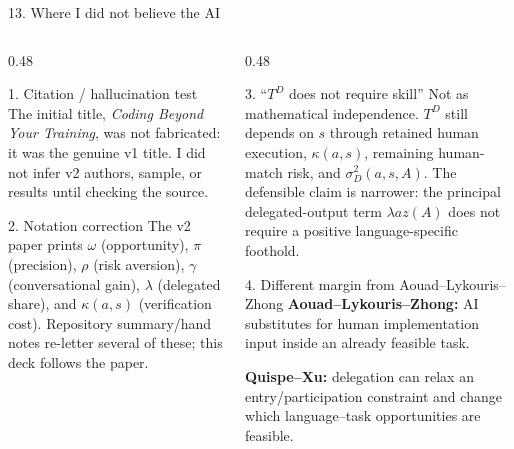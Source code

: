 \documentclass[aspectratio=169,10pt]{beamer}
\begin{document}
\begin{frame}{13. Where I did not believe the AI}
  \vspace{-0.03cm}
  \begin{columns}[T,onlytextwidth]
    \begin{column}{0.48\textwidth}
      \begin{block}{1. Citation / hallucination test}
        \scriptsize The initial title, \emph{Coding Beyond Your Training}, was not fabricated: it was the genuine v1 title. I did not infer v2 authors, sample, or results until checking the source.
      \end{block}

      \begin{block}{2. Notation correction}
        \scriptsize The v2 paper prints $\omega$ (opportunity), $\pi$ (precision), $\rho$ (risk aversion), $\gamma$ (conversational gain), $\lambda$ (delegated share), and $\kappa(a,s)$ (verification cost). Repository summary/hand notes re-letter several of these; this deck follows the paper.
      \end{block}
    \end{column}
    \begin{column}{0.48\textwidth}
      \begin{alertblock}{3. ``$T^D$ does not require skill''}
        \scriptsize Not as mathematical independence. $T^D$ still depends on $s$ through retained human execution, $\kappa(a,s)$, remaining human-match risk, and $\sigma_D^2(a,s,A)$. The defensible claim is narrower: the principal delegated-output term $\lambda az(A)$ does not require a positive language-specific foothold.
      \end{alertblock}

      \begin{exampleblock}{4. Different margin from Aouad--Lykouris--Zhong}
        \scriptsize
        \textbf{Aouad--Lykouris--Zhong:} AI substitutes for human implementation input inside an already feasible task.\par\smallskip
        \textbf{Quispe--Xu:} delegation can relax an entry/participation constraint and change which language--task opportunities are feasible.
      \end{exampleblock}
    \end{column}
  \end{columns}
\end{frame}
\end{document}

